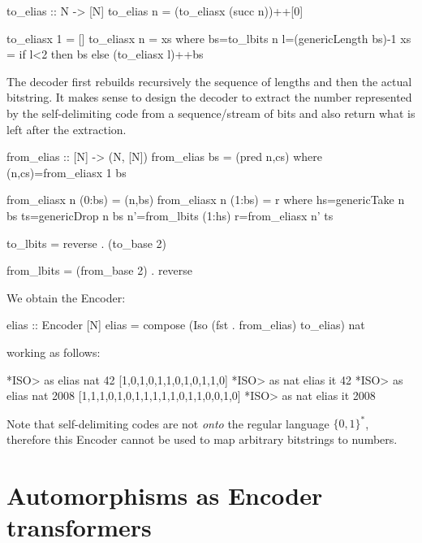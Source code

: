 \documentclass[]{INCLUDES/llncs}
\begin{document}
\begin{code}
to_elias :: N -> [N]
to_elias n = (to_eliasx (succ n))++[0]

to_eliasx 1 = []
to_eliasx n = xs where
  bs=to_lbits n
  l=(genericLength bs)-1
  xs = if l<2 then bs else (to_eliasx l)++bs
\end{code}
The decoder first rebuilds recursively the
sequence of lengths and then the actual bitstring.
It makes sense to design the decoder to extract the number
represented by the self-delimiting code from a sequence/stream 
of bits and also return what is left after the extraction.
\begin{code}
from_elias :: [N] -> (N, [N])
from_elias bs = (pred n,cs) where (n,cs)=from_eliasx 1 bs

from_eliasx n (0:bs) = (n,bs)
from_eliasx n (1:bs) = r where 
  hs=genericTake n bs
  ts=genericDrop n bs
  n'=from_lbits (1:hs)
  r=from_eliasx n' ts 

to_lbits = reverse . (to_base 2)

from_lbits = (from_base 2) . reverse
\end{code}
We obtain the Encoder:
\begin{code}
elias :: Encoder [N]
elias = compose (Iso (fst . from_elias) to_elias) nat
\end{code}
working as follows:
\begin{codex}
*ISO> as elias nat 42
[1,0,1,0,1,1,0,1,0,1,1,0]
*ISO> as nat elias it
42
*ISO> as elias nat 2008
[1,1,1,0,1,0,1,1,1,1,1,0,1,1,0,0,1,0]
*ISO> as nat elias it
2008
\end{codex}
Note that self-delimiting codes are not {\em onto} the regular language
$\{0,1\}^*$, therefore this Encoder cannot be used to map arbitrary bitstrings
to numbers.


\section{Automorphisms as Encoder transformers}
\end{document}
